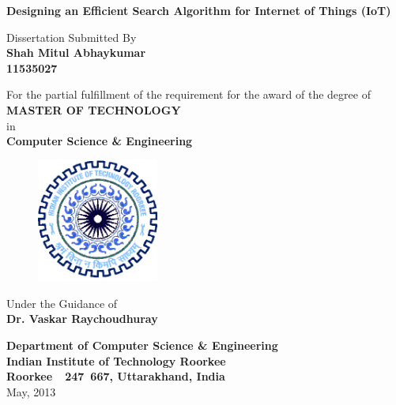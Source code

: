 \documentclass [a4paper,12pt]{book}
\begin{document}
\begin{titlepage}

\begin{center}
\Large {\textbf{Designing an Efficient Search Algorithm for Internet of Things (IoT)}}
\end{center}

\vspace{1.0cm}
\begin{center}
Dissertation Submitted By\\ \vspace{0.3cm}
 {\large \textbf{Shah Mitul Abhaykumar}}\\ \textbf{11535027}
\end{center}

\begin{center}
For the partial fulfillment of the requirement for the award of the degree of\\
\vspace{0.4cm}
 {\textbf{MASTER OF TECHNOLOGY}}\\ \vspace{0.2cm}
 in \\ \vspace{0.2cm}
{\textbf{Computer Science \& Engineering}}\\ \vspace{0.1cm}
\end{center}

\vspace{0.5cm}
\begin{figure}[!h]
\begin{center}
\includegraphics[width=4.0cm]{images/logo.png}
\end{center}
\end{figure}

\vspace{0.1cm}

\begin{center}
Under the Guidance of\\ \vspace{0.2cm} {\large \textbf{Dr. Vaskar Raychoudhuray}}
\end{center}
\vspace{0.2cm}

\begin{center}
\large{\textbf{Department of Computer Science \& Engineering}\\
\textbf{Indian Institute of Technology Roorkee}\\
\textbf{Roorkee~~247~667, Uttarakhand, India}}\\

\large May, 2013\\
\thispagestyle{empty}
\end{center}
\end{titlepage}
\end{document}

